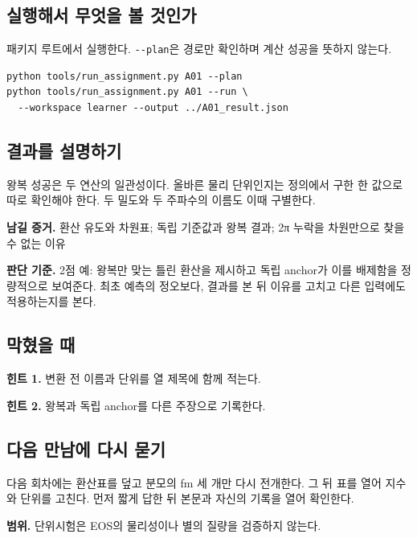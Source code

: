 \documentclass[
  10pt,
  a4paper,
]{article}
\begin{document}
\newpage

\subsection{실행해서 무엇을 볼
것인가}\label{uxc2e4uxd589uxd574uxc11c-uxbb34uxc5c7uxc744-uxbcfc-uxac83uxc778uxac00}

패키지 루트에서 실행한다. \texttt{-\/-plan}은 경로만 확인하며 계산
성공을 뜻하지 않는다.

\begin{verbatim}
python tools/run_assignment.py A01 --plan
python tools/run_assignment.py A01 --run \
  --workspace learner --output ../A01_result.json
\end{verbatim}

\subsection{결과를
설명하기}\label{uxacb0uxacfcuxb97c-uxc124uxba85uxd558uxae30}

왕복 성공은 두 연산의 일관성이다. 올바른 물리 단위인지는 정의에서 구한
한 값으로 따로 확인해야 한다. 두 밀도와 두 주파수의 이름도 이때
구별한다.

\textbf{남길 증거.} 환산 유도와 차원표; 독립 기준값과 왕복 결과; 2π
누락을 차원만으로 찾을 수 없는 이유

\textbf{판단 기준.} 2점 예: 왕복만 맞는 틀린 환산을 제시하고 독립
anchor가 이를 배제함을 정량적으로 보여준다. 최초 예측의 정오보다, 결과를
본 뒤 이유를 고치고 다른 입력에도 적용하는지를 본다.

\subsection{막혔을 때}\label{uxb9c9uxd614uxc744-uxb54c}

\textbf{힌트 1.} 변환 전 이름과 단위를 열 제목에 함께 적는다.

\textbf{힌트 2.} 왕복과 독립 anchor를 다른 주장으로 기록한다.

\subsection{다음 만남에 다시
묻기}\label{uxb2e4uxc74c-uxb9ccuxb0a8uxc5d0-uxb2e4uxc2dc-uxbb3buxae30}

다음 회차에는 환산표를 덮고 분모의 fm 세 개만 다시 전개한다. 그 뒤 표를
열어 지수와 단위를 고친다. 먼저 짧게 답한 뒤 본문과 자신의 기록을 열어
확인한다.

\textbf{범위.} 단위시험은 EOS의 물리성이나 별의 질량을 검증하지 않는다.
\end{document}
